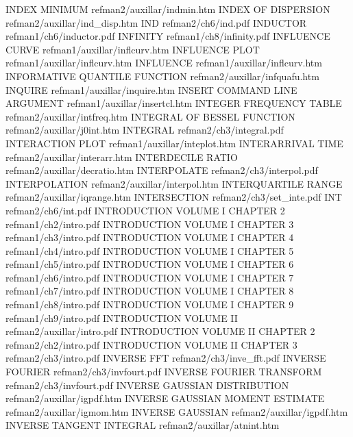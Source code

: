 INDEX MINIMUM                           refman2/auxillar/indmin.htm
INDEX OF DISPERSION                     refman2/auxillar/ind_disp.htm
IND                                     refman2/ch6/ind.pdf
INDUCTOR                                refman1/ch6/inductor.pdf
INFINITY                                refman1/ch8/infinity.pdf
INFLUENCE CURVE                         refman1/auxillar/inflcurv.htm
INFLUENCE PLOT                          refman1/auxillar/inflcurv.htm
INFLUENCE                               refman1/auxillar/inflcurv.htm
INFORMATIVE QUANTILE FUNCTION           refman2/auxillar/infquafu.htm
INQUIRE                                 refman1/auxillar/inquire.htm
INSERT COMMAND LINE ARGUMENT            refman1/auxillar/insertcl.htm
INTEGER FREQUENCY TABLE                 refman2/auxillar/intfreq.htm
INTEGRAL OF BESSEL FUNCTION             refman2/auxillar/j0int.htm
INTEGRAL                                refman2/ch3/integral.pdf
INTERACTION PLOT                        refman1/auxillar/inteplot.htm
INTERARRIVAL TIME                       refman2/auxillar/interarr.htm
INTERDECILE RATIO                       refman2/auxillar/decratio.htm
INTERPOLATE                             refman2/ch3/interpol.pdf
INTERPOLATION                           refman2/auxillar/interpol.htm
INTERQUARTILE RANGE                     refman2/auxillar/iqrange.htm
INTERSECTION                            refman2/ch3/set_inte.pdf
INT                                     refman2/ch6/int.pdf
INTRODUCTION VOLUME I CHAPTER 2         refman1/ch2/intro.pdf
INTRODUCTION VOLUME I CHAPTER 3         refman1/ch3/intro.pdf
INTRODUCTION VOLUME I CHAPTER 4         refman1/ch4/intro.pdf
INTRODUCTION VOLUME I CHAPTER 5         refman1/ch5/intro.pdf
INTRODUCTION VOLUME I CHAPTER 6         refman1/ch6/intro.pdf
INTRODUCTION VOLUME I CHAPTER 7         refman1/ch7/intro.pdf
INTRODUCTION VOLUME I CHAPTER 8         refman1/ch8/intro.pdf
INTRODUCTION VOLUME I CHAPTER 9         refman1/ch9/intro.pdf
INTRODUCTION VOLUME II                  refman2/auxillar/intro.pdf
INTRODUCTION VOLUME II CHAPTER 2        refman2/ch2/intro.pdf
INTRODUCTION VOLUME II CHAPTER 3        refman2/ch3/intro.pdf
INVERSE FFT                             refman2/ch3/inve_fft.pdf
INVERSE FOURIER                         refman2/ch3/invfourt.pdf
INVERSE FOURIER TRANSFORM               refman2/ch3/invfourt.pdf
INVERSE GAUSSIAN DISTRIBUTION           refman2/auxillar/igpdf.htm
INVERSE GAUSSIAN MOMENT ESTIMATE        refman2/auxillar/igmom.htm
INVERSE GAUSSIAN                        refman2/auxillar/igpdf.htm
INVERSE TANGENT INTEGRAL                refman2/auxillar/atnint.htm
